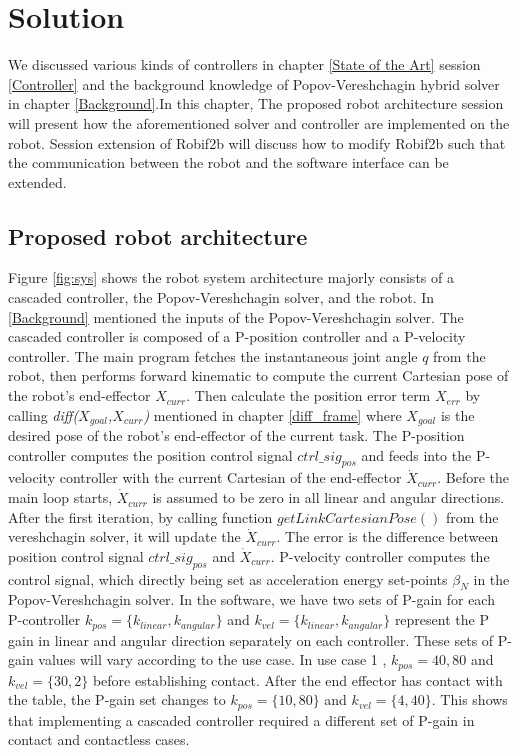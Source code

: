 \documentclass[report.tex]{subfiles}
\begin{document}
    \chapter{Solution}
    \label{Solution}
    We discussed various kinds of controllers in chapter \ref{State of the Art} session \ref{Controller} and the background knowledge of Popov-Vereshchagin hybrid solver in chapter \ref{Background}.In this chapter, The proposed robot architecture session will present how the aforementioned solver and controller are implemented on the robot. Session extension of Robif2b will discuss how to modify Robif2b such that the communication between the robot and the software interface can be extended.

    \section{Proposed robot architecture}

    Figure \ref{fig:sys} shows the robot system architecture majorly consists of a cascaded controller, the Popov-Vereshchagin solver, and the robot. In \ref{Background} mentioned the inputs of the Popov-Vereshchagin solver. The cascaded controller is composed of a P-position controller and a P-velocity controller. The main program fetches the instantaneous joint angle $q$ from the robot, then performs forward kinematic to compute the current Cartesian pose of the robot's end-effector $X_{curr}$. Then calculate the position error term $X_{err}$ by calling \textit{diff($X_{goal}$,$X_{curr}$)} mentioned in chapter \ref{diff_frame} where $X_{goal}$ is the desired pose of the robot's end-effector of the current task. The P-position controller computes the position control signal $ctrl\_sig_{pos}$ and feeds into the P-velocity controller with the current Cartesian of the end-effector $\dot{X}_{curr}$. Before the main loop starts, $\dot{X}_{curr}$ is assumed to be zero in all linear and angular directions. After the first iteration, by calling function $getLinkCartesianPose()$ from the vereshchagin solver, it will update the $\dot{X}_{curr}$. The error is the difference between position control signal $ctrl\_sig_{pos}$ and $\dot{X}_{curr}$. P-velocity controller computes the control signal, which directly being set as acceleration energy set-points $\beta_N$ in the Popov-Vereshchagin solver. In the software, we have two sets of P-gain for each P-controller $k_{pos} = \{k_{linear},k_{angular}\}$ and $k_{vel} = \{k_{linear},k_{angular}\}$ represent the P gain in linear and angular direction separately on each controller. These sets of P-gain values will vary according to the use case. In use case 1 , $k_{pos} = {40,80}$ and $k_{vel} = \{30,2\}$ before establishing contact. After the end effector has contact with the table, the P-gain set changes to $k_{pos} = \{10,80\}$ and $k_{vel} = \{4,40\}$. This shows that implementing a cascaded controller required a different set of P-gain in contact and contactless cases.
\end{document}

